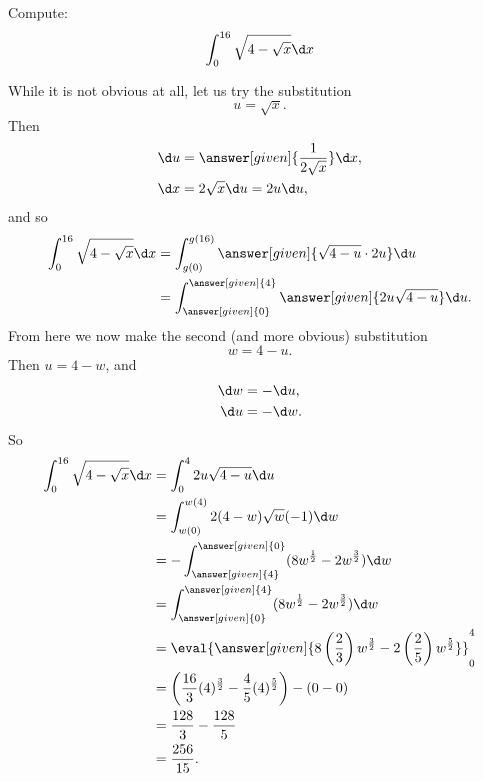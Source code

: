 \documentclass{ximera}
\begin{document}
\begin{example}
Compute:
\[
\int_0^{16} \sqrt{4 - \sqrt{x}} \d x
\]
\begin{explanation}
While it is not obvious at all, let us try the substitution
\[
u = \sqrt{x}.
\]
Then
\begin{align*}
\d u &= \answer[given]{\frac{1}{2 \sqrt{x}}} \d x,\\
\d x &= 2 \sqrt{x} \d u = 2u \d u,
\end{align*}
and so
\begin{align*}
\int_0^{16} \sqrt{4 - \sqrt{x}} \d x &= \int_{g(0)}^{g(16)} \answer[given]{\sqrt{4-u} \cdot 2u} \d u  \\
&= \int_{\answer[given]{0}}^{\answer[given]{4}} \answer[given]{2u \sqrt{4-u}} \d u.
\end{align*}
From here we now make the second (and more obvious) substitution
\[
w = 4-u.
\]
Then $u = 4-w$, and
\begin{align*}
\d w &= - \d u,\\
\d u &= - \d w.
\end{align*}
So
\begin{align*}
\int_0^{16} \sqrt{4 - \sqrt{x}} \d x &= \int_0^4 2u \sqrt{4-u} \d u  \\
&= \int_{w(0)}^{w(4)} 2 (4-w) \sqrt{w} (-1) \d w  \\
&= - \int_{\answer[given]{4}}^{\answer[given]{0}} ( 8w^{\frac{1}{2}} - 2w^{\frac{3}{2}} ) \d w  \\
&= \int_{\answer[given]{0}}^{\answer[given]{4}} ( 8w^{\frac{1}{2}} - 2w^{\frac{3}{2}} ) \d w  \\
&= \eval{ \answer[given]{8 \left( \frac{2}{3} \right) w^{\frac{3}{2}} - 2 \left( \frac{2}{5} \right) w^{\frac{5}{2}}} }_{0}^{4}  \\
&= \left( \frac{16}{3} (4)^{\frac{3}{2}} - \frac{4}{5} (4)^{\frac{5}{2}} \right) - \left( 0 - 0 \right)  \\
&= \frac{128}{3} - \frac{128}{5}   \\
&= \frac{256}{15}.
\end{align*}
\end{explanation}
\end{example}
\end{document}
